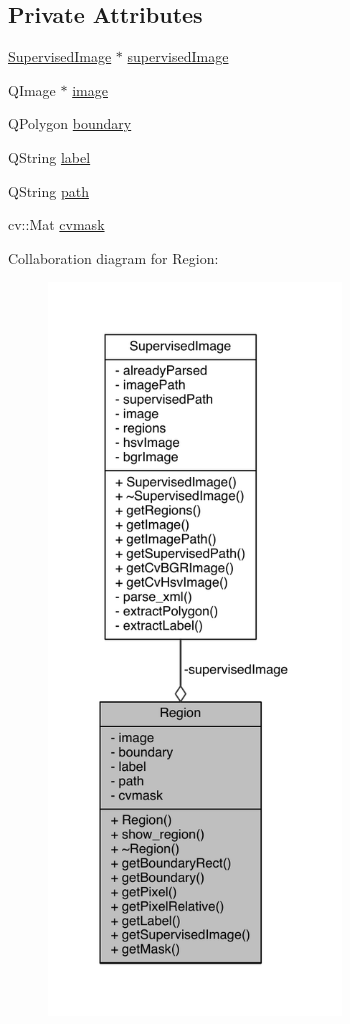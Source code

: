 \subsection*{Private Attributes}
\begin{DoxyCompactItemize}
\item 
\hyperlink{class_supervised_image}{Supervised\+Image} $\ast$ \hyperlink{class_region_a897932b50cdd155984c06575726f9b69}{supervised\+Image}
\item 
Q\+Image $\ast$ \hyperlink{class_region_a090b8bc9a8c73f8f874d8d439a0843be}{image}
\item 
Q\+Polygon \hyperlink{class_region_a4a59ef37013f3a6515a79317b0f0b4c0}{boundary}
\item 
Q\+String \hyperlink{class_region_afcc063386e02be883d71eaf5bcef2a55}{label}
\item 
Q\+String \hyperlink{class_region_af07da6f0f304272539c1239847280045}{path}
\item 
cv\+::\+Mat \hyperlink{class_region_a7ac28a04ed9590f61007073e5e48089f}{cvmask}
\end{DoxyCompactItemize}


Collaboration diagram for Region\+:
\nopagebreak
\begin{figure}[H]
\begin{center}
\leavevmode
\includegraphics[height=550pt]{class_region__coll__graph}
\end{center}
\end{figure}


